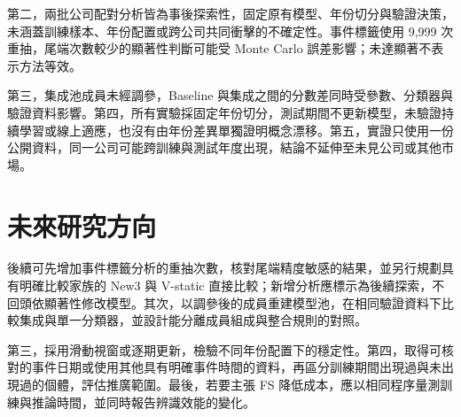 第二，兩批公司配對分析皆為事後探索性，固定原有模型、年份切分與驗證決策，未涵蓋訓練樣本、年份配置或跨公司共同衝擊的不確定性。事件標籤使用 9,999 次重抽，尾端次數較少的顯著性判斷可能受 Monte Carlo 誤差影響；未達顯著不表示方法等效。

第三，集成池成員未經調參，Baseline 與集成之間的分數差同時受參數、分類器與驗證資料影響。第四，所有實驗採固定年份切分，測試期間不更新模型，未驗證持續學習或線上適應，也沒有由年份差異單獨證明概念漂移。第五，實證只使用一份公開資料，同一公司可能跨訓練與測試年度出現，結論不延伸至未見公司或其他市場。

\section{未來研究方向}

後續可先增加事件標籤分析的重抽次數，核對尾端精度敏感的結果，並另行規劃具有明確比較家族的 New3 與 V-static 直接比較；新增分析應標示為後續探索，不回頭依顯著性修改模型。其次，以調參後的成員重建模型池，在相同驗證資料下比較集成與單一分類器，並設計能分離成員組成與整合規則的對照。

第三，採用滑動視窗或逐期更新，檢驗不同年份配置下的穩定性。第四，取得可核對的事件日期或使用其他具有明確事件時間的資料，再區分訓練期間出現過與未出現過的個體，評估推廣範圍。最後，若要主張 FS 降低成本，應以相同程序量測訓練與推論時間，並同時報告辨識效能的變化。
\endgroup

